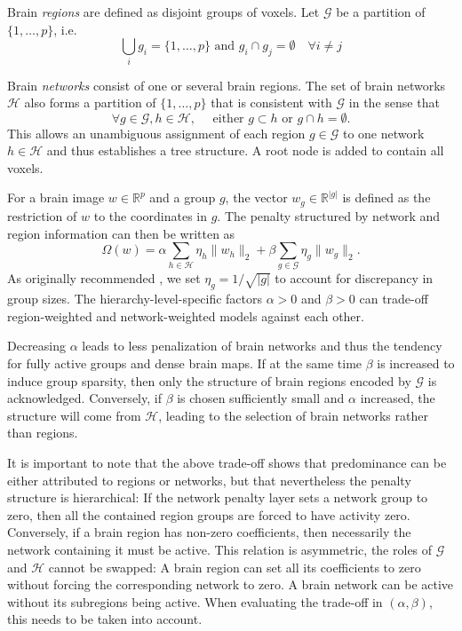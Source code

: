 \documentclass{article}
\newcommand{\R}{\mathbb{R}}
\begin{document}
Brain \textit{regions} are defined as disjoint groups of voxels. Let \(\mathcal G\)
be a partition of \(\{1, \dots, p\}\), i.e.
\[  \bigcup_{i} g_i = \{1, \dots, p\} \textrm{ and } g_i\cap g_j=\emptyset
\quad\forall i\not=j\]

Brain \textit{networks} consist of one or several brain regions.
The set of brain networks \(\mathcal{H}\) also forms a partition of 
\(\{1, \dots, p\}\) that is consistent with \(\mathcal G\) in
the sense that
\[\forall g\in\mathcal G, h\in\mathcal H,\quad
\textrm{ either } g\subset h\textrm{ or }g\cap h = \emptyset.\]
This allows an unambiguous assignment of each region \(g\in\mathcal G\) to one
network \(h\in\mathcal H\) and thus establishes a tree structure.
A root node is added to contain all voxels.

For a brain image \(w\in\R^p\) and a group \(g\), the vector 
\(w_g\in\R^{|g|}\) is defined as the restriction of \(w\) to the coordinates
 in \(g\). The penalty structured by network
and region information can then be written as
\[\Omega(w) = \alpha\sum_{h\in\mathcal H}\eta_h\|w_h\|_2 + \beta\sum_{g\in\mathcal G}\eta_g\|w_g\|_2.\]
As originally recommended \cite{yuan2006model},
we set \(\eta_g = 1/\sqrt{|g|}\) to
account for discrepancy in group sizes. The hierarchy-level-specific factors 
\(\alpha > 0\) and \(\beta > 0\) can trade-off region-weighted and
network-weighted models against each other.

Decreasing \(\alpha\) leads to less 
penalization of brain networks and thus the tendency for fully active groups
and dense brain maps. If at the same time \(\beta\) is increased to 
induce group sparsity, then only the structure of brain regions encoded
by \(\mathcal G\) is acknowledged. Conversely, if \(\beta\) is chosen 
sufficiently small and \(\alpha\) increased,
the structure will come from \(\mathcal H\), leading to the
selection of brain networks rather than regions.

It is important to note that the above trade-off shows that predominance
can be either attributed to regions or networks, but that nevertheless the
penalty structure is hierarchical: If the network penalty layer sets a
network group to zero, then all the contained region groups are forced to
have activity zero. Conversely, if a brain region has non-zero coefficients,
then necessarily the network containing it must be active.
This relation is asymmetric, the roles of \(\mathcal G\) and \(\mathcal H\) 
cannot be swapped: A brain 
region can set all its coefficients to zero without forcing the 
corresponding network to zero. A brain network can be active without its
subregions being active.
When evaluating the trade-off in \((\alpha, \beta)\), this needs to be taken
into account.
\end{document}
